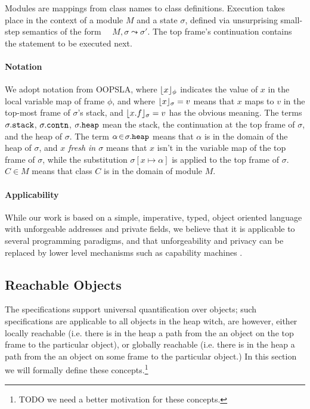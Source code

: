  
Modules are mappings from class names to class definitions. 
Execution 
takes place
 in the context of  a module $M$ and   a state $\sigma$,
 defined via unsurprising small-step semantics of the form \ \ 
   $M, \sigma \leadsto \sigma'$.
The   top frame's continuation contains the statement to be 
executed next.  

\paragraph{Notation} We adopt notation from OOPSLA, where
 $\lfloor x \rfloor_{\phi}$  indicates the value of $x$   in the local variable map of frame $\phi$, 
 and where $\lfloor x \rfloor_{\sigma} = v$ means that $x$ 
maps to $v$ in the top-most frame of $\sigma$'s stack, and $\lfloor x.f \rfloor_{\sigma} = v$
has the obvious meaning. The terms $\sigma.{\texttt{stack}}$,  
$\sigma.{\texttt{contn}}$,  
$\sigma.{\texttt{heap}}$     mean the stack, 
the continuation at the
top frame of $\sigma$, %
and the heap of $\sigma$.
The term $\alpha\!\in\!\sigma.{\texttt{heap}}$ means that $\alpha$ is in the domain of the heap of $\sigma$, and \emph{$x$ fresh in $\sigma$} means that 
$x$ isn't in the variable map of the top frame of $\sigma$, 
while the substitution  $\sigma[x \mapsto \alpha]$ is applied to the top frame of $\sigma$.
 \ $C\in M$ means that class $C$ is in the domain of module $M$. 


\paragraph{Applicability} 
{While our work is based on 
  a simple, imperative, typed, object oriented}
language with unforgeable addresses and private fields, we believe
 that %
 it is applicable to several programming paradigms, and 
 that   unforgeability and privacy
 can be replaced 
 by lower level mechanisms such as capability machines \cite{vanproving,davis2019cheriabi}.

  \subsection{{Reachable  Objects}}
  
{The  \SpecLang  specifications support universal quantification over  objects; such specifications 
are applicable  to all objects in the heap witch, are however, either locally reachable (i.e. there is in the heap a path from the an 
object on the top frame to the particular object), or globally reachable (i.e. there is in the heap a path from the an 
object on some frame to the particular object.)
In this section  we will formally define these concepts.}\footnote{TODO we need a better motivation for these concepts.}
 



